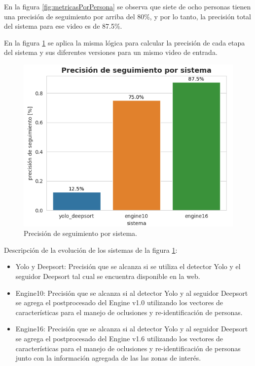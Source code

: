 En la figura \ref{fig:metricasPorPersona} se observa que siete de ocho personas tienen una precisión de seguimiento por arriba del 80\%, y por lo tanto, la precisión total del sistema para ese video es de 87.5\%. 

En la figura \ref{fig:metricasPorSistema} se aplica la misma lógica para calcular la precisión de cada etapa del sistema y sus diferentes versiones para un mismo video de entrada.

\newpage

\begin{figure}[ht]
	\centering
	\includegraphics[scale=.80]{./Figures/metricasPorSistema.png}
	\caption{Precisión de seguimiento por sistema.}
	\label{fig:metricasPorSistema}
\end{figure}

Descripción de la evolución de los sistemas de la figura \ref{fig:metricasPorSistema}:
\begin{itemize}
\item Yolo y Deepsort: Precisión que se alcanza si se utiliza el detector Yolo y el seguidor Deepsort tal cual se encuentra disponible en la web.
\item Engine10: Precisión que se alcanza si al detector Yolo y al seguidor Deepsort se agrega el postprocesado del Engine v1.0 utilizando los vectores de características para el manejo de oclusiones y re-identificación de personas.
\item Engine16: Precisión que se alcanza si al detector Yolo y al seguidor Deepsort se agrega el postprocesado del Engine v1.6 utilizando los vectores de características para el manejo de oclusiones y re-identificación de personas junto con la información agregada de las las zonas de interés.
\end{itemize}

